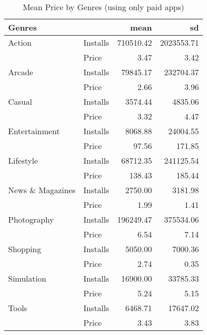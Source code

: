 \documentclass[
]{article}
\begin{document}
\begin{table}

\caption{\label{tab:unnamed-chunk-7}Mean Price by Genres (using only paid apps)}
\centering
\begin{tabular}[t]{llrr}
\toprule
Genres &   & mean & sd\\
\midrule
Action & Installs & \num{710510.42} & \num{2023553.71}\\
 & Price & \num{3.47} & \num{3.42}\\
Arcade & Installs & \num{79845.17} & \num{232704.37}\\
 & Price & \num{2.66} & \num{3.96}\\
Casual & Installs & \num{3574.44} & \num{4835.06}\\
 & Price & \num{3.32} & \num{4.47}\\
Entertainment & Installs & \num{8068.88} & \num{24004.55}\\
 & Price & \num{97.56} & \num{171.85}\\
Lifestyle & Installs & \num{68712.35} & \num{241125.54}\\
 & Price & \num{138.43} & \num{185.44}\\
News \& Magazines & Installs & \num{2750.00} & \num{3181.98}\\
 & Price & \num{1.99} & \num{1.41}\\
Photography & Installs & \num{196249.47} & \num{375534.06}\\
 & Price & \num{6.54} & \num{7.14}\\
Shopping & Installs & \num{5050.00} & \num{7000.36}\\
 & Price & \num{2.74} & \num{0.35}\\
Simulation & Installs & \num{16900.00} & \num{33785.33}\\
 & Price & \num{5.24} & \num{5.15}\\
Tools & Installs & \num{6468.71} & \num{17647.02}\\
 & Price & \num{3.43} & \num{3.83}\\
\bottomrule
\end{tabular}
\end{table}
\end{document}
